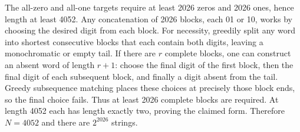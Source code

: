 The all-zero and all-one targets require at least 2026 zeros and 2026 ones, hence length at least 4052. Any concatenation of 2026 blocks, each 01 or 10, works by choosing the desired digit from each block. For necessity, greedily split any word into shortest consecutive blocks that each contain both digits, leaving a monochromatic or empty tail. If there are $r$ complete blocks, one can construct an absent word of length $r+1$: choose the final digit of the first block, then the final digit of each subsequent block, and finally a digit absent from the tail. Greedy subsequence matching places these choices at precisely those block ends, so the final choice fails. Thus at least 2026 complete blocks are required. At length 4052 each has length exactly two, proving the claimed form. Therefore $\boxed{N=4052}$ and there are $\boxed{2^{2026}}$ strings.
